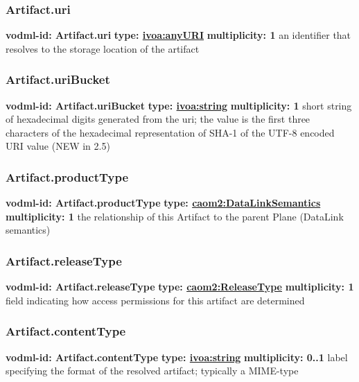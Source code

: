     \subsubsection{Artifact.uri}
      \textbf{vodml-id: Artifact.uri} \newline
      \textbf{type: \hyperref[sect:ivoa]{ivoa:anyURI}} \newline
      \textbf{multiplicity: 1} \newline
      an identifier that resolves to the storage location of the artifact

    \subsubsection{Artifact.uriBucket}
      \textbf{vodml-id: Artifact.uriBucket} \newline
      \textbf{type: \hyperref[sect:ivoa]{ivoa:string}} \newline
      \textbf{multiplicity: 1} \newline
      short string of hexadecimal digits generated from the uri; the value is the first three characters of the hexadecimal representation of SHA-1 of the UTF-8 encoded URI value (NEW in 2.5)

    \subsubsection{Artifact.productType}
      \textbf{vodml-id: Artifact.productType} \newline
      \textbf{type: \hyperref[sect:DataLinkSemantics]{caom2:DataLinkSemantics}} \newline
      \textbf{multiplicity: 1} \newline
      the relationship of this Artifact to the parent Plane (DataLink semantics)

    \subsubsection{Artifact.releaseType}
      \textbf{vodml-id: Artifact.releaseType} \newline
      \textbf{type: \hyperref[sect:ReleaseType]{caom2:ReleaseType}} \newline
      \textbf{multiplicity: 1} \newline
      field indicating how access permissions for this artifact are determined

    \subsubsection{Artifact.contentType}
      \textbf{vodml-id: Artifact.contentType} \newline
      \textbf{type: \hyperref[sect:ivoa]{ivoa:string}} \newline
      \textbf{multiplicity: 0..1} \newline
      label specifying the format of the resolved artifact; typically a MIME-type

